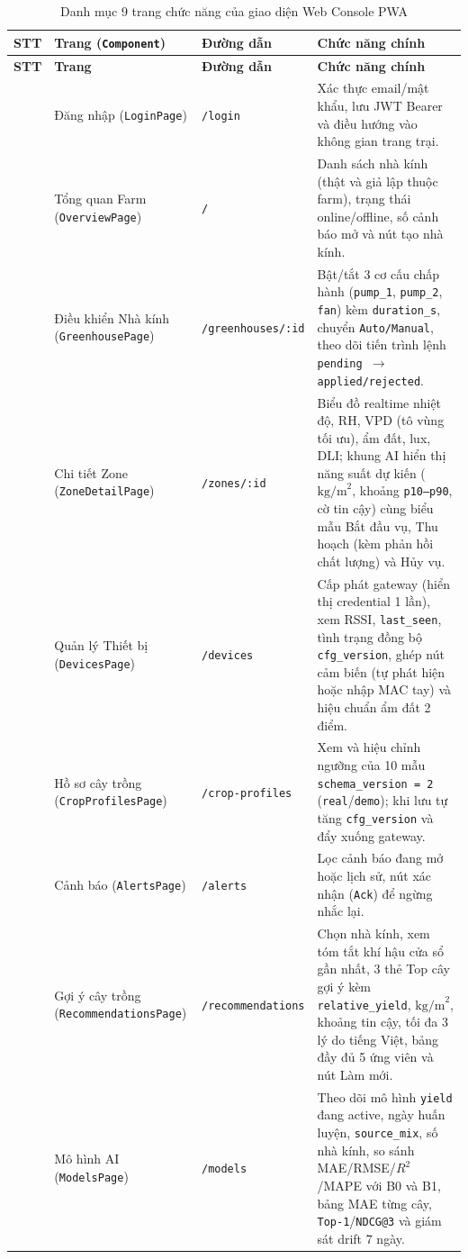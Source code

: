 \begingroup
\scriptsize
\sloppy
\setlength{\tabcolsep}{3pt}
\renewcommand{\arraystretch}{1.1}
\begin{longtable}{|>{\centering\arraybackslash}p{}|>{\raggedright\arraybackslash}p{}|>{\raggedright\arraybackslash}p{}|>{\raggedright\arraybackslash}p{}|}
\caption{Danh mục 9 trang chức năng của giao diện Web Console PWA}\label{tab:web-pages}\\
\hline
\textbf{STT} & \textbf{Trang (\texttt{Component})} & \textbf{Đường dẫn} & \textbf{Chức năng chính} \\
\hline
\endfirsthead
\hline
\textbf{STT} & \textbf{Trang} & \textbf{Đường dẫn} & \textbf{Chức năng chính} \\
\hline
\endhead
1 & Đăng nhập (\texttt{LoginPage}) & \texttt{/login} & Xác thực email/mật khẩu, lưu JWT Bearer và điều hướng vào không gian trang trại. \\ \hline
2 & Tổng quan Farm (\texttt{OverviewPage}) & \texttt{/} & Danh sách nhà kính (thật và giả lập thuộc farm), trạng thái online/offline, số cảnh báo mở và nút tạo nhà kính. \\ \hline
3 & Điều khiển Nhà kính (\texttt{GreenhousePage}) & \texttt{/greenhouses/:id} & Bật/tắt 3 cơ cấu chấp hành (\texttt{pump\_1}, \texttt{pump\_2}, \texttt{fan}) kèm \texttt{duration\_s}, chuyển \texttt{Auto/Manual}, theo dõi tiến trình lệnh \texttt{pending \(\rightarrow\) applied/rejected}. \\ \hline
4 & Chi tiết Zone (\texttt{ZoneDetailPage}) & \texttt{/zones/:id} & Biểu đồ realtime nhiệt độ, RH, VPD (tô vùng tối ưu), ẩm đất, lux, DLI; khung AI hiển thị năng suất dự kiến (\(\text{kg/m}^2\), khoảng \texttt{p10--p90}, cờ tin cậy) cùng biểu mẫu Bắt đầu vụ, Thu hoạch (kèm phản hồi chất lượng) và Hủy vụ. \\ \hline
5 & Quản lý Thiết bị (\texttt{DevicesPage}) & \texttt{/devices} & Cấp phát gateway (hiển thị credential 1 lần), xem RSSI, \texttt{last\_seen}, tình trạng đồng bộ \texttt{cfg\_version}, ghép nút cảm biến (tự phát hiện hoặc nhập MAC tay) và hiệu chuẩn ẩm đất 2 điểm. \\ \hline
6 & Hồ sơ cây trồng (\texttt{CropProfilesPage}) & \texttt{/crop-profiles} & Xem và hiệu chỉnh ngưỡng của 10 mẫu \texttt{schema\_version = 2} (\texttt{real}/\texttt{demo}); khi lưu tự tăng \texttt{cfg\_version} và đẩy xuống gateway. \\ \hline
7 & Cảnh báo (\texttt{AlertsPage}) & \texttt{/alerts} & Lọc cảnh báo đang mở hoặc lịch sử, nút xác nhận (\texttt{Ack}) để ngừng nhắc lại. \\ \hline
8 & Gợi ý cây trồng (\texttt{RecommendationsPage}) & \texttt{/recommendations} & Chọn nhà kính, xem tóm tắt khí hậu cửa sổ gần nhất, 3 thẻ Top cây gợi ý kèm \texttt{relative\_yield}, \(\text{kg/m}^2\), khoảng tin cậy, tối đa 3 lý do tiếng Việt, bảng đầy đủ 5 ứng viên và nút Làm mới. \\ \hline
9 & Mô hình AI (\texttt{ModelsPage}) & \texttt{/models} & Theo dõi mô hình \texttt{yield} đang active, ngày huấn luyện, \texttt{source\_mix}, số nhà kính, so sánh MAE/RMSE/\(R^2\)/MAPE với B0 và B1, bảng MAE từng cây, \texttt{Top-1}/\texttt{NDCG@3} và giám sát drift 7 ngày. \\ \hline
\end{longtable}
